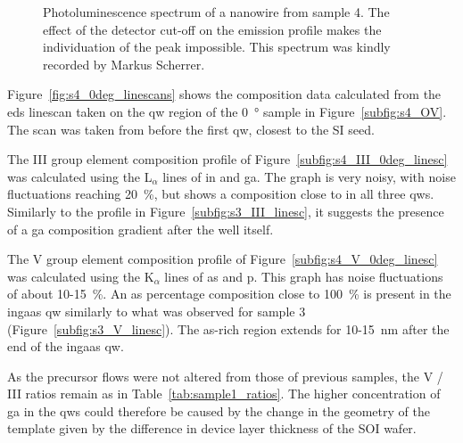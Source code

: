 \begin{figure}
    \centering
    \caption[Photoluminescence spectrum of a nanowire from sample 4.]{Photoluminescence spectrum of a nanowire from sample 4. The effect of the detector cut-off on the emission profile makes the individuation of the peak impossible. This spectrum was kindly recorded by Markus Scherrer.}
    \label{fig:s4_pl}
\end{figure}

Figure~\ref{fig:s4_0deg_linescans} shows the composition data calculated from the \acs{eds} linescan taken on the \acl{qw} region of the \qty{0}{\degree} sample in Figure~\ref{subfig:s4_OV}. The scan was taken from before the first \acl{qw}, closest to the \acl{SI} seed.

The III group element composition profile of Figure~\ref{subfig:s4_III_0deg_linesc} was calculated using the L\(_\alpha\) lines of \acl{in} and \acl{ga}. The graph is very noisy, with noise fluctuations reaching \qty{20}{\%}, but shows a composition close to  in all three \acl{qw}s. Similarly to the profile in Figure~\ref{subfig:s3_III_linesc}, it suggests the presence of a \acl{ga} composition gradient after the well itself. 

The V group element composition profile of Figure~\ref{subfig:s4_V_0deg_linesc} was calculated using the K\(_\alpha\) lines of \acl{as} and \acl{p}. This graph has noise fluctuations of about \num{10}-\qty{15}{\%}. An \acl{as} percentage composition close to \qty{100}{\%} is present in the \acs{ingaas} \acl{qw} similarly to what was observed for sample 3 (Figure~\ref{subfig:s3_V_linesc}). The \acs{as}-rich region extends for \num{10}-\qty{15}{\nano\metre} after the end of the \acs{ingaas} \acl{qw}.

As the precursor flows were not altered from those of previous samples, the V / III ratios remain as in Table~\ref{tab:sample1_ratios}. The higher concentration of \acl{ga} in the \acl{qw}s could therefore be caused by the change in the geometry of the template given by the difference in device layer thickness of the  \acs{SOI} wafer.

